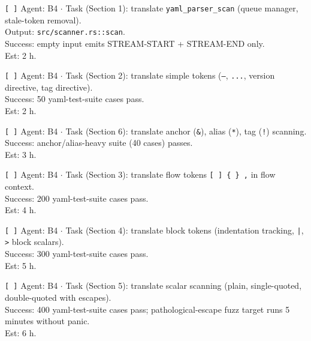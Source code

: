 \documentclass[12pt]{article}
\theoremstyle{definition}
\theoremstyle{remark}
\begin{document}
\begin{flushleft}
\texttt{[\,]} Agent: B4 \(\cdot\) Task (Section 1): translate
\texttt{yaml\_parser\_scan} (queue manager, stale-token removal).
\\
\quad Output: \texttt{src/scanner.rs::scan}.
\\
\quad Success: empty input emits STREAM-START + STREAM-END only.
\\
\quad Est: 2 h.
\end{flushleft}

\begin{flushleft}
\texttt{[\,]} Agent: B4 \(\cdot\) Task (Section 2): translate simple
tokens (\texttt{---}, \texttt{...}, version directive,
tag directive).
\\
\quad Success: 50 yaml-test-suite cases pass.
\\
\quad Est: 2 h.
\end{flushleft}

\begin{flushleft}
\texttt{[\,]} Agent: B4 \(\cdot\) Task (Section 6): translate
anchor (\texttt{\&}), alias (\texttt{*}), tag (\texttt{!}) scanning.
\\
\quad Success: anchor/alias-heavy suite (40 cases) passes.
\\
\quad Est: 3 h.
\end{flushleft}

\begin{flushleft}
\texttt{[\,]} Agent: B4 \(\cdot\) Task (Section 3): translate flow
tokens \texttt{[ ] \{ \} ,} in flow context.
\\
\quad Success: 200 yaml-test-suite cases pass.
\\
\quad Est: 4 h.
\end{flushleft}

\begin{flushleft}
\texttt{[\,]} Agent: B4 \(\cdot\) Task (Section 4): translate block
tokens (indentation tracking, \texttt{|}, \texttt{>} block scalars).
\\
\quad Success: 300 yaml-test-suite cases pass.
\\
\quad Est: 5 h.
\end{flushleft}

\begin{flushleft}
\texttt{[\,]} Agent: B4 \(\cdot\) Task (Section 5): translate scalar
scanning (plain, single-quoted, double-quoted with escapes).
\\
\quad Success: 400 yaml-test-suite cases pass; pathological-escape
fuzz target runs 5 minutes without panic.
\\
\quad Est: 6 h.
\end{flushleft}
\end{document}
